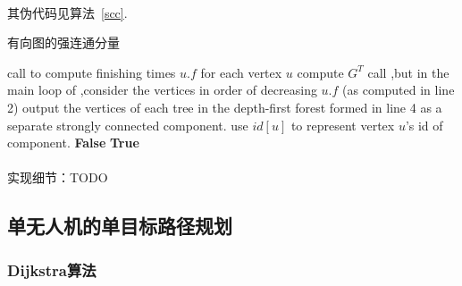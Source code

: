 \documentclass[UTF8,a4paper]{ctexart}
\begin{document}
\paragraph{}其伪代码见算法~\ref{scc}.
\begin{algorithm}
    \caption{有向图的强连通分量}\label{scc}
    \begin{algorithmic}[1] %
        \State call  to compute finishing times {$u.f$} for each vertex {$u$}
        \State compute {$G^T$}
        \State call ,but in the main loop of ,consider the vertices in order of decreasing {$u.f$} (as computed in line 2)
        \State output the vertices of each tree in the depth-first forest formed in line 4 as a separate strongly connected component. use $id[u]$ to represent vertex $u$'s id of component.
        \EndFunction
        \State
        \State {}
        \EndFunction
        \State
        \State {}
        \EndFunction
        \State
        \State \Return \textbf{False}
        \EndIf
        \EndFor
        \State \Return \textbf{True}
        \EndFunction
    \end{algorithmic}
\end{algorithm}

\paragraph{}实现细节：TODO


\subsection{单无人机的单目标路径规划}
\subsubsection{Dijkstra算法}\label{sec:dijkstra}
\end{document}
